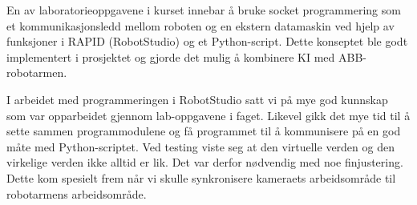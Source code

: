 \documentclass[conference]{IEEEtran}
\begin{document}
    En av laboratorieoppgavene i kurset innebar å bruke socket programmering som et kommunikasjonsledd mellom roboten og en ekstern datamaskin ved hjelp av funksjoner i RAPID (RobotStudio) og et Python-script. Dette konseptet ble godt implementert i prosjektet og gjorde det mulig å kombinere KI med ABB-robotarmen. 

    I arbeidet med programmeringen i RobotStudio satt vi på mye god kunnskap som var opparbeidet gjennom lab-oppgavene i faget. Likevel gikk det 
    mye tid til å sette sammen programmodulene og få programmet til å kommunisere på en god måte med Python-scriptet. Ved testing viste seg at den 
    virtuelle verden og den virkelige verden ikke alltid er lik. Det var derfor nødvendig med noe finjustering. Dette kom spesielt frem når vi 
    skulle synkronisere kameraets arbeidsområde til robotarmens arbeidsområde. 




%
%
%




\newpage
\appendix

\end{document}
